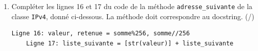 \begin{enumerate}[resume=monDS]
    

   \medskip

\item Compléter les lignes 16 et 17 du code de la méthode \verb|adresse_suivante| de la classe \verb|IPv4|, donné ci-dessous. La méthode doit correspondre au docstring. (/)

  \begin{blocvisible}[height=3]
        \begin{lstlisting}[frame=none, numbers=none]
    Ligne 16: valeur, retenue = somme%256, somme//256
    Ligne 17: liste_suivante = [str(valeur)] + liste_suivante     
    \end{lstlisting}
    \end{blocvisible}


   \end{enumerate}
